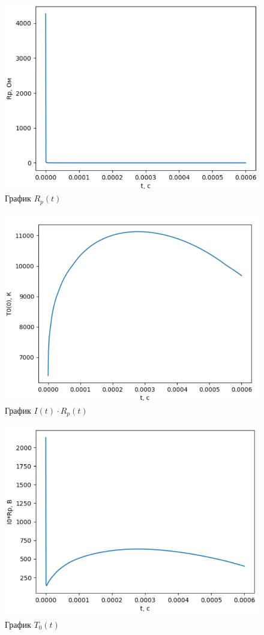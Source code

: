 \begin{figure}[h]
	
	\includegraphics[scale=0.45]{"img/3.png"}
	\caption{График $R_p(t)$}
\end{figure}
\newpage
\begin{figure}[h]
	\includegraphics[scale=0.45]{img/4.png}
	\caption{График $I(t)\cdot R_p(t)$}
\end{figure}
\begin{figure}[h!]
	\includegraphics[scale=0.45]{img/5.png}
	\caption{График $T_0(t)$}
\end{figure}
